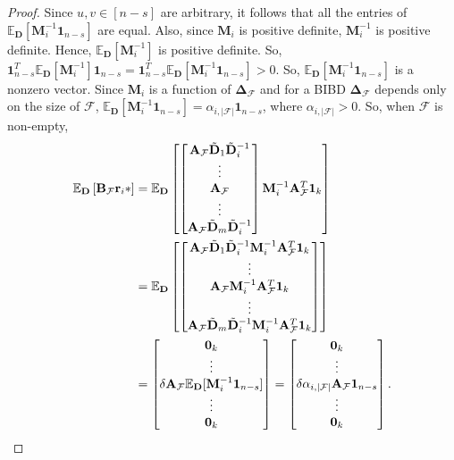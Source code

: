 \documentclass[journal,draftcls,onecolumn]{IEEEtran}
\theoremstyle{mystyle}
\newcommand{\bfD}{\mathbf{D}}
\newcommand{\bfM}{\mathbf{M}}
\newcommand{\cF}{\mathcal{F}}
\begin{document}
\begin{proof}
Since $u,v \in [n-s]$ are arbitrary, it follows that all the entries of $\mathbb{E}_{\mathbf{D}}[\mathbf{M}_i^{-1} \mathbf{1}_{n-s}]$ are equal. Also, since $\mathbf{M}_i$ is positive definite, $\mathbf{M}_i^{-1}$ is positive definite. Hence, $\mathbb{E}_{\mathbf{D}}[\mathbf{M}_i^{-1}]$ is positive definite. So, $\mathbf{1}_{n-s}^T\mathbb{E}_{\mathbf{D}}[\mathbf{M}_i^{-1}] \mathbf{1}_{n-s} = \mathbf{1}_{n-s}^T\mathbb{E}_{\mathbf{D}}[\mathbf{M}_i^{-1} \mathbf{1}_{n-s}] > 0$. So, $\mathbb{E}_{\mathbf{D}}[\mathbf{M}_i^{-1} \mathbf{1}_{n-s}]$ is a nonzero vector. Since $\bfM_i$ is a function of $\mathbf{\Delta}_{\cF}$ and for a BIBD $\mathbf{\Delta}_{\cF}$ depends only on the size of $\cF$, $\mathbb{E}_{\mathbf{D}} [ \mathbf{M}_i^{-1}\mathbf{1}_{n-s}] = \alpha_{i,|\cF|} \mathbf{1}_{n-s}$, where $\alpha_{i,|\cF|} > 0$. So, when $\mathcal{F}$ is non-empty,
\begin{align*}
\mathbb{E}_{\mathbf{D}}\left[\mathbf{B}_{\mathcal{F}}\mathbf{r}_i*\right] & = \mathbb{E}_{\mathbf{D}}\left[\begin{bmatrix} \mathbf{A}_{\cF} \tilde{\bfD}_1\tilde{\bf{D}}_i^{-1} \\ \vdots \\\mathbf{A}_{\cF} \\ \vdots \\  \mathbf{A}_{\cF} \tilde{\bfD}_m\tilde{\bf{D}}_i^{-1}\end{bmatrix} \bfM_i^{-1}\mathbf{A}_{\cF}^T \mathbf{1}_k \right]\\
&=\mathbb{E}_{\mathbf{D}}\left[\begin{bmatrix} \mathbf{A}_{\cF} \tilde{\bfD}_1\tilde{\bf{D}}_i^{-1} \bfM_i^{-1}\mathbf{A}_{\cF}^T \mathbf{1}_k \\ \vdots \\\mathbf{A}_{\cF}\bfM_i^{-1}\mathbf{A}_{\cF}^T \mathbf{1}_k  \\ \vdots \\  \mathbf{A}_{\cF} \tilde{\bfD}_m\tilde{\bf{D}}_i^{-1}\bfM_i^{-1}\mathbf{A}_{\cF}^T \mathbf{1}_k \end{bmatrix} \right]\\
&= \begin{bmatrix} \mathbf{0}_k\\ \vdots \\ \delta \mathbf{A}_{\mathcal{F}}\mathbb{E}_{\mathbf{D}}[ \mathbf{M}_i^{-1}\mathbf{1}_{n-s}] \\ \vdots\\ \mathbf{0}_k \end{bmatrix} =  \begin{bmatrix} \mathbf{0}_k\\ \vdots \\ \delta \alpha_{i, |\cF|} \mathbf{A}_{\mathcal{F}} \mathbf{1}_{n-s} \\ \vdots\\ \mathbf{0}_k \end{bmatrix}.

\end{align*}
\end{proof}
\end{document}
